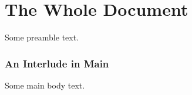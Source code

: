 \documentclass{book}
\begin{document}
\part{The Whole Document}

Some preamble text.



\section{An Interlude in Main}

Some main body text.


\end{document}
